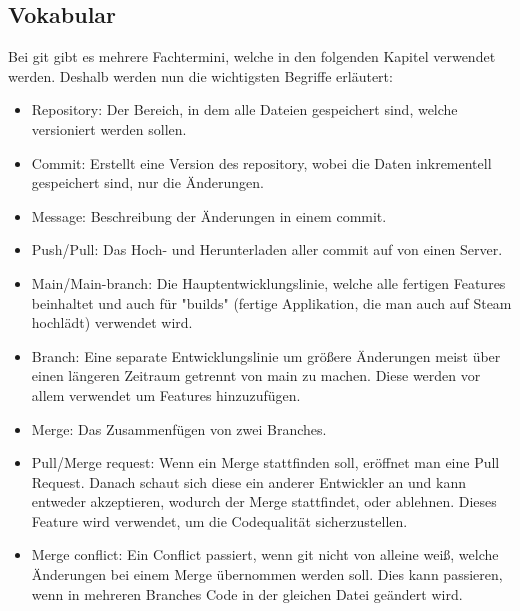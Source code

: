\renewcommand{\kapitelautor}{Autor: Felix Zwickelstorfer}
\subsection{Vokabular}\label{subsec:git-vokabular}


\renewcommand{\kapitelautor}{Autor: Felix Zwickelstorfer}

Bei git gibt es mehrere Fachtermini, welche in den folgenden Kapitel verwendet werden.
Deshalb werden nun die wichtigsten Begriffe erläutert:

\begin{itemize}
    \item Repository: Der Bereich, in dem alle Dateien gespeichert sind, welche versioniert werden sollen.
    \item Commit: Erstellt eine Version des repository, wobei die Daten inkrementell gespeichert sind, \dah nur die Änderungen.
    \item Message: Beschreibung der Änderungen in einem commit.
    \item Push/Pull: Das Hoch- und Herunterladen aller commit auf \bzw von einen Server.
    \item Main/Main-branch: Die Hauptentwicklungslinie, welche alle fertigen Features beinhaltet und auch für "builds" (fertige Applikation, die man auch auf Steam hochlädt) verwendet wird.
    \item Branch: Eine separate Entwicklungslinie um größere Änderungen meist über einen längeren Zeitraum getrennt von main zu machen.
    Diese werden vor allem verwendet um Features hinzuzufügen.
    \item Merge: Das Zusammenfügen von zwei Branches.
    \item Pull/Merge request: Wenn ein Merge stattfinden soll, eröffnet man eine Pull Request.
    Danach schaut sich diese ein anderer Entwickler an und kann entweder akzeptieren, wodurch der Merge stattfindet, oder ablehnen.
    Dieses Feature wird verwendet, um die Codequalität sicherzustellen.
    \item Merge conflict: Ein Conflict passiert, wenn git nicht von alleine weiß, welche Änderungen bei einem Merge übernommen werden soll.
    Dies kann passieren, wenn in mehreren Branches Code in der gleichen Datei geändert wird.\cite{gitHomePage}
\end{itemize}


